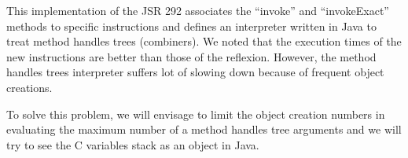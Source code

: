 \documentclass{sig-alternate}
\def \Jsr{JSR\xspace}
\def \JSR{\Jsr 292\xspace}
\begin{document}
  This implementation of the \JSR associates the ``invoke'' and ``invokeExact'' methods to specific instructions
  and defines an interpreter written in Java to treat method handles trees (combiners).
  We noted that the execution times of the new instructions are better than those of the reflexion.
  However, the method handles trees interpreter suffers lot of slowing down because of frequent object creations.
  
  To solve this problem, we will envisage to limit the object creation numbers in evaluating the maximum number of a method handles tree arguments
  and we will try to see the C variables stack as an object in Java.

\appendix


\makeatletter
  \def\@seccntformat#1{Appendix~\csname the#1\endcsname:\quad}
\makeatother

% 

\end{document}
